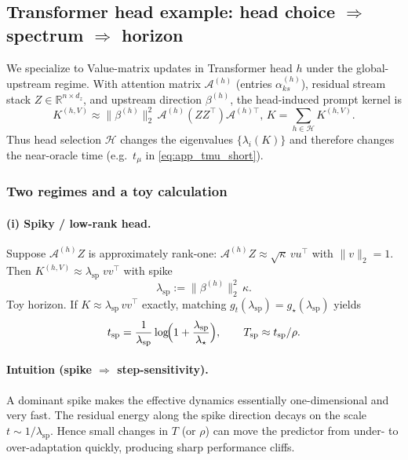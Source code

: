 \documentclass{article}
\theoremstyle{plain}
\theoremstyle{definition}
\theoremstyle{remark}
\begin{document}
\subsection{Transformer head example: head choice $\Rightarrow$ spectrum $\Rightarrow$ horizon}

We specialize to Value-matrix updates in Transformer head $h$ under the global-upstream regime. With attention matrix $\mathcal{A}^{(h)}$ (entries $\alpha_{ks}^{(h)}$), residual stream stack $Z\in\mathbb{R}^{n\times d_z}$, and upstream direction $\beta^{(h)}$, the head-induced prompt kernel is
\begin{equation}
K^{(h,V)}\approx \|\beta^{(h)}\|_2^2\,\mathcal{A}^{(h)}(ZZ^\top)\mathcal{A}^{(h)\top},
\,
K=\sum_{h\in\mathcal{H}}K^{(h,V)}.
\label{eq:app_head_kernel_short}
\end{equation}
Thus head selection $\mathcal{H}$ changes the eigenvalues $\{\lambda_i(K)\}$ and therefore changes the near-oracle time (e.g.\ $t_\mu$ in \eqref{eq:app_tmu_short}).

\subsubsection{Two regimes and a toy calculation}

\paragraph{(i) Spiky / low-rank head.}
Suppose $\mathcal{A}^{(h)}Z$ is approximately rank-one:
$\mathcal{A}^{(h)}Z\approx \sqrt{\kappa}\,v u^\top$ with $\|v\|_2=1$.
Then $K^{(h,V)}\approx \lambda_{\mathrm{sp}}\;vv^\top$ with spike
\[
\lambda_{\mathrm{sp}}:=\|\beta^{(h)}\|_2^2\,\kappa.
\]
Toy horizon. If $K\approx \lambda_{\mathrm{sp}}\,vv^\top$ exactly, matching $g_t(\lambda_{\mathrm{sp}})=g_\star(\lambda_{\mathrm{sp}})$ yields
\begin{equation}
t_{\mathrm{sp}}
=
\frac{1}{\lambda_{\mathrm{sp}}}\log\!\Bigl(1+\frac{\lambda_{\mathrm{sp}}}{\lambda_\star}\Bigr),
\qquad
T_{\mathrm{sp}}\approx t_{\mathrm{sp}}/\rho.
\label{eq:app_spike_time_short}
\end{equation}


\paragraph{Intuition (spike $\Rightarrow$ step-sensitivity).}
A dominant spike makes the effective dynamics essentially one-dimensional and very fast. The residual energy along the spike direction decays on the scale $t\sim 1/\lambda_{\mathrm{sp}}$.
Hence small changes in $T$ (or $\rho$) can move the predictor from under- to over-adaptation quickly, producing sharp performance cliffs.
\end{document}
